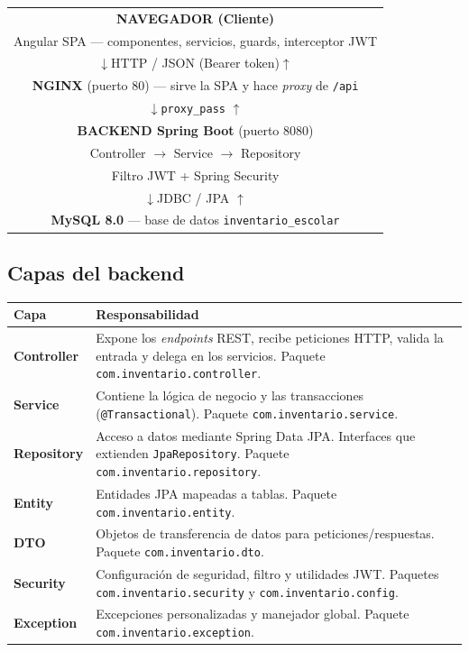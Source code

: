 \documentclass[11pt,a4paper]{article}
\begin{document}
\begin{center}
\footnotesize
\begin{tabular}{|c|}
\hline
\textbf{NAVEGADOR (Cliente)} \\
Angular SPA --- componentes, servicios, guards, interceptor JWT \\
\hline
$\downarrow$\quad HTTP / JSON \quad (Bearer token)\quad $\uparrow$ \\
\hline
\textbf{NGINX} (puerto 80) --- sirve la SPA y hace \emph{proxy} de \texttt{/api} \\
\hline
$\downarrow$\quad \texttt{proxy\_pass} \quad $\uparrow$ \\
\hline
\textbf{BACKEND Spring Boot} (puerto 8080) \\
Controller $\rightarrow$ Service $\rightarrow$ Repository \\
Filtro JWT + Spring Security \\
\hline
$\downarrow$\quad JDBC / JPA \quad $\uparrow$ \\
\hline
\textbf{MySQL 8.0} --- base de datos \texttt{inventario\_escolar} \\
\hline
\end{tabular}
\end{center}

\subsection{Capas del backend}

\begin{longtable}{>{\bfseries}p{3cm} p{11.5cm}}
\toprule
\textbf{Capa} & \textbf{Responsabilidad} \\
\midrule
\endhead
Controller & Expone los \emph{endpoints} REST, recibe peticiones HTTP,
            valida la entrada y delega en los servicios. Paquete
            \texttt{com.inventario.controller}. \\
Service & Contiene la lógica de negocio y las transacciones
          (\texttt{@Transactional}). Paquete \texttt{com.inventario.service}. \\
Repository & Acceso a datos mediante Spring Data JPA. Interfaces que
             extienden \texttt{JpaRepository}. Paquete
             \texttt{com.inventario.repository}. \\
Entity & Entidades JPA mapeadas a tablas. Paquete
         \texttt{com.inventario.entity}. \\
DTO & Objetos de transferencia de datos para peticiones/respuestas.
      Paquete \texttt{com.inventario.dto}. \\
Security & Configuración de seguridad, filtro y utilidades JWT. Paquetes
           \texttt{com.inventario.security} y \texttt{com.inventario.config}. \\
Exception & Excepciones personalizadas y manejador global. Paquete
            \texttt{com.inventario.exception}. \\
\bottomrule
\end{longtable}
\end{document}
